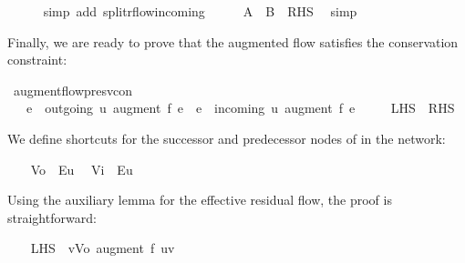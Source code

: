 \begin{isabellebody}
\ \ \ \ \isamarkupfalse%
\ {\isacharparenleft}simp\ add{\isacharcolon}\ split{\isacharunderscore}rflow{\isacharunderscore}incoming{\isacharparenright}\isanewline
\ \ \isamarkupfalse%
\ \isamarkupfalse%
\ {\isachardoublequoteopen}{\isacharquery}A\ {\isacharminus}\ {\isacharquery}B\ {\isacharequal}\ {\isacharquery}RHS{\isachardoublequoteclose}\ \isamarkupfalse%
\ simp\isanewline
{}\isamarkupfalse%
%
\endisatagproof
{\isafoldproof}%
%
\isadelimproof
%
\endisadelimproof
%
\begin{isamarkuptext}%
Finally, we are ready to prove that the augmented flow satisfies the 
  conservation constraint:%
\end{isamarkuptext}\isamarkuptrue%
\isamarkupfalse%
\ augment{\isacharunderscore}flow{\isacharunderscore}presv{\isacharunderscore}con{\isacharcolon}\ \isanewline
\ \ \ {\isachardoublequoteopen}{\isacharparenleft}{\isasymSum}e\ {\isasymin}\ outgoing\ u{\isachardot}\ augment\ f{\isacharprime}\ e{\isacharparenright}\ {\isacharequal}\ {\isacharparenleft}{\isasymSum}e\ {\isasymin}\ incoming\ u{\isachardot}\ augment\ f{\isacharprime}\ e{\isacharparenright}{\isachardoublequoteclose}\isanewline
\ \ \ \ {\isacharparenleft}\ {\isachardoublequoteopen}{\isacharquery}LHS\ {\isacharequal}\ {\isacharquery}RHS{\isachardoublequoteclose}{\isacharparenright}\isanewline
%
\isadelimproof
%
\endisadelimproof
%
\isatagproof
{}\isamarkupfalse%
\ {\isacharminus}%
\begin{isamarkuptext}%
We define shortcuts for the successor and predecessor nodes of  
    in the network:%
\end{isamarkuptext}\isamarkuptrue%
\ \ \isamarkupfalse%
\ {\isacharquery}Vo\ {\isacharequal}\ {\isachardoublequoteopen}E{\isacharbackquote}{\isacharbackquote}{\isacharbraceleft}u{\isacharbraceright}{\isachardoublequoteclose}\ \isamarkupfalse%
\ {\isacharquery}Vi\ {\isacharequal}\ {\isachardoublequoteopen}E{\isasyminverse}{\isacharbackquote}{\isacharbackquote}{\isacharbraceleft}u{\isacharbraceright}{\isachardoublequoteclose}%
\begin{isamarkuptext}%
Using the auxiliary lemma for the effective residual flow,
    the proof is straightforward:%
\end{isamarkuptext}\isamarkuptrue%
\ \ \isamarkupfalse%
\ {\isachardoublequoteopen}{\isacharquery}LHS\ {\isacharequal}\ {\isacharparenleft}{\isasymSum}v{\isasymin}{\isacharquery}Vo{\isachardot}\ augment\ f{\isacharprime}\ {\isacharparenleft}u{\isacharcomma}v{\isacharparenright}{\isacharparenright}{\isachardoublequoteclose}\isanewline

\end{isabellebody}
